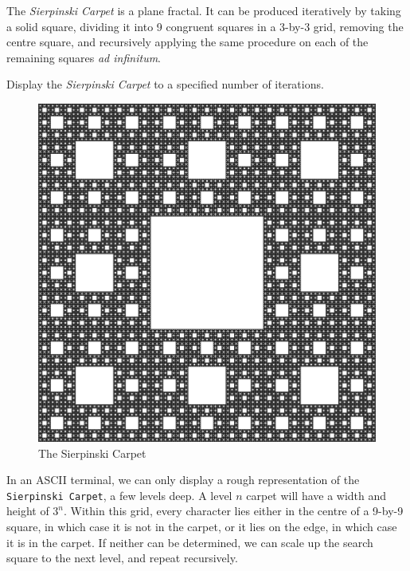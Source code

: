 

\problem The \textit{Sierpinski Carpet} is a plane fractal. It can be produced iteratively by taking a solid square, dividing
it into 9 congruent squares in a 3-by-3 grid, removing the centre square, and recursively applying the same procedure on each
of the remaining squares \textit{ad infinitum}.

Display the \textit{Sierpinski Carpet} to a specified number of iterations. 

\begin{figure}[h]
	\begin{center}
		\includegraphics[scale=0.15]{sierpinski.png}
	\end{center}
	\caption*{The Sierpinski Carpet}
	\label{fig:sierpinski_carpet}
\end{figure}

\solution In an ASCII terminal, we can only display a rough representation of the \texttt{Sierpinski Carpet}, a few levels deep.
A level $n$ carpet will have a width and height of $3^n$. Within this grid, every character lies either in the centre of a 9-by-9
square, in which case it is not in the carpet, or it lies on the edge, in which case it is in the carpet. If neither can be 
determined, we can scale up the search square to the next level, and repeat recursively.

